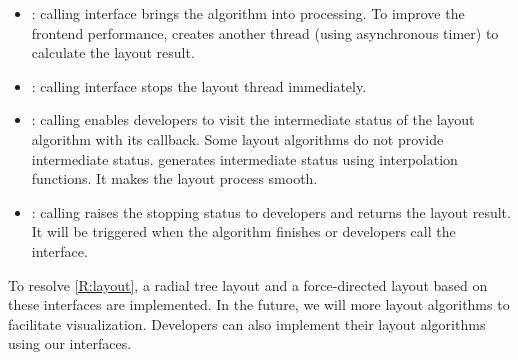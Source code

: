\begin{itemize}
    \item
        : calling   interface brings the algorithm into processing. To improve the frontend performance, \name creates another thread (using asynchronous timer) to calculate the layout result.
    \item
        : calling   interface stops the layout thread immediately.
    \item
    : calling   enables developers to visit the intermediate status of the layout algorithm with its callback.
    Some layout algorithms do not provide intermediate status. \name generates intermediate status using interpolation functions. It makes the layout process smooth.
    \item
        : calling  raises the stopping status to developers and returns the layout result. It will be triggered when the algorithm finishes or  developers call the  interface.
\end{itemize}


    To resolve \ref{R:layout}, a radial tree layout and a force-directed layout based on these interfaces are implemented. In the future, we will  more layout algorithms to facilitate visualization. Developers can also implement their layout algorithms using our interfaces.

